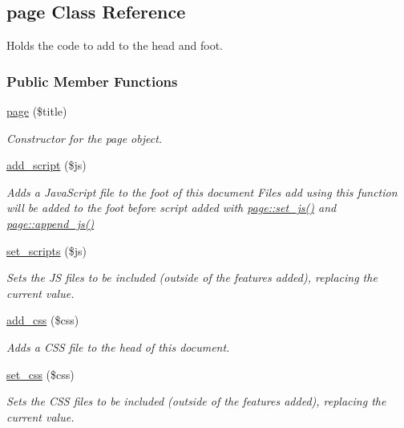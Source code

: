 \hypertarget{classpage}{\subsection{page Class Reference}
\label{classpage}
}


Holds the code to add to the head and foot.  


\subsubsection*{Public Member Functions}
\begin{DoxyCompactItemize}
\item 
\hyperlink{classpage_ac263e47b354ee96045b4f12e0c45da72}{page} (\$title)
\begin{DoxyCompactList}\small\item\em Constructor for the page object. \end{DoxyCompactList}\item 
\hyperlink{classpage_acbf2e50910fbabc4af83701b87064476}{add\-\_\-script} (\$js)
\begin{DoxyCompactList}\small\item\em Adds a Java\-Script file to the foot of this document Files add using this function will be added to the foot before script added with \hyperlink{classpage_a7b3ad75f4c2f61b55ec27aff1a41ca93}{page\-::set\-\_\-js()} and \hyperlink{classpage_a438a833a311c04927ababd5a632d83a7}{page\-::append\-\_\-js()} \end{DoxyCompactList}\item 
\hyperlink{classpage_a75526b06ca1a417bab2473740f80808e}{set\-\_\-scripts} (\$js)
\begin{DoxyCompactList}\small\item\em Sets the J\-S files to be included (outside of the features added), replacing the current value. \end{DoxyCompactList}\item 
\hyperlink{classpage_aa03ff10ebee5c14921287921ed1b1bb9}{add\-\_\-css} (\$css)
\begin{DoxyCompactList}\small\item\em Adds a C\-S\-S file to the head of this document. \end{DoxyCompactList}\item 
\hyperlink{classpage_af4c12b3536455dadfd585eb1b1373e09}{set\-\_\-css} (\$css)
\begin{DoxyCompactList}\small\item\em Sets the C\-S\-S files to be included (outside of the features added), replacing the current value. \end{DoxyCompactList}\item 

\end{DoxyCompactItemize}
